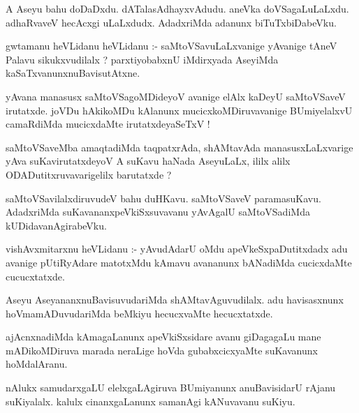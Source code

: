 \documentclass{article}
\begin{document}
\begin{mn}
A Aseyu  bahu  doDaDxdu.  dATalasAdhayxvAdudu.  aneVka  doVSagaLuLaLxdu.  
adhaRvaveV  hecAcxgi  uLaLxdudx.  AdadxriMda  adanunx  biTuTxbiDabeVku.
\end{mn}

\begin{mn}
gwtamanu  heVLidanu  heVLidanu :- saMtoVSavuLaLxvanige  yAvanige  tAneV  Palavu  
sikukxvudilalx ?  parxtiyobabxnU  iMdirxyada  AseyiMda  kaSaTxvanunxnuBavisutAtxne.
\end{mn}

\begin{mn}
yAvana  manasusx  saMtoVSagoMDideyoV  avanige  elAlx  kaDeyU  saMtoVSaveV  irutatxde.  joVDu  
hAkikoMDu  kAlanunx  mucicxkoMDiruvavanige  BUmiyelalxvU  camaRdiMda  mucicxdaMte  irutatxdeyaSeTxV !
\end{mn}

\begin{mn}
saMtoVSaveMba  amaqtadiMda  taqpatxrAda,  shAMtavAda  manasusxLaLxvarige  yAva  suKavirutatxdeyoV  
A  suKavu  haNada  AseyuLaLx,  ililx  alilx  ODADutitxruvavarigelilx  barutatxde ?
\end{mn}

\begin{mn}
saMtoVSavilalxdiruvudeV  bahu  duHKavu.  saMtoVSaveV  paramasuKavu.  AdadxriMda  
suKavananxpeVkiSxsuvavanu  yAvAgalU  saMtoVSadiMda  kUDidavanAgirabeVku.
\end{mn}

\begin{mn}
vishAvxmitarxnu  heVLidanu :- yAvudAdarU  oMdu  apeVkeSxpaDutitxdadx  adu  avanige  
pUtiRyAdare  matotxMdu  kAmavu  avananunx  bANadiMda  cucicxdaMte  cucucxtatxde. 
\end{mn}

\begin{mn}
Aseyu  AseyananxnuBavisuvudariMda  shAMtavAguvudilalx.  adu  havisasxnunx  
hoVmamADuvudariMda  beMkiyu  hecucxvaMte  hecucxtatxde.
\end{mn}

\begin{mn}
ajAcnxnadiMda  kAmagaLanunx  apeVkiSxsidare  avanu  giDagagaLu  mane  mADikoMDiruva  
marada  neraLige  hoVda  gubabxcicxyaMte  suKavanunx  hoMdalAranu.
\end{mn}

\begin{mn}
nAlukx  samudarxgaLU  elelxgaLAgiruva  BUmiyanunx  anuBavisidarU  rAjanu  suKiyalalx.  
kalulx  cinanxgaLanunx  samanAgi  kANuvavanu  suKiyu.
\end{mn}
\end{document}
